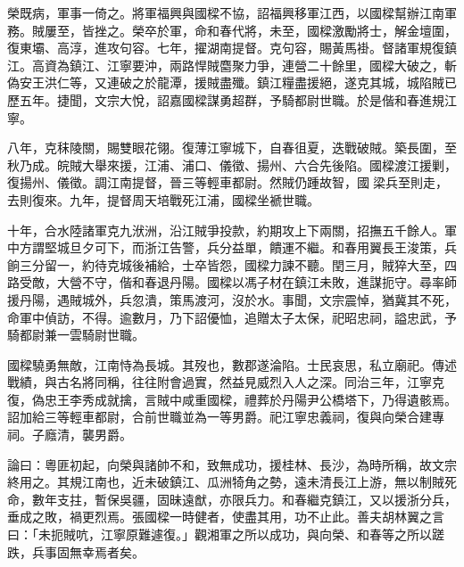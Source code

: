 \begin{pinyinscope}
榮既病，軍事一倚之。將軍福興與國樑不協，詔福興移軍江西，以國樑幫辦江南軍務。賊屢至，皆挫之。榮卒於軍，命和春代將，未至，國樑激勵將士，解金壇圍，復東壩、高淳，進攻句容。七年，擢湖南提督。克句容，賜黃馬褂。督諸軍規復鎮江。高資為鎮江、江寧要沖，兩路悍賊麕聚力爭，連營二十餘里，國樑大破之，斬偽安王洪仁等，又連破之於龍潭，援賊盡殲。鎮江糧盡援絕，遂克其城，城陷賊已歷五年。捷聞，文宗大悅，詔嘉國樑謀勇超群，予騎都尉世職。於是偕和春進規江寧。

八年，克秣陵關，賜雙眼花翎。復薄江寧城下，自春徂夏，迭戰破賊。築長圍，至秋乃成。皖賊大舉來援，江浦、浦口、儀徵、揚州、六合先後陷。國樑渡江援剿，復揚州、儀徵。調江南提督，晉三等輕車都尉。然賊仍踵故智，國梁兵至則走，去則復來。九年，提督周天培戰死江浦，國樑坐褫世職。

十年，合水陸諸軍克九洑洲，沿江賊爭投款，約期攻上下兩關，招撫五千餘人。軍中方謂堅城旦夕可下，而浙江告警，兵分益單，饋運不繼。和春用翼長王浚策，兵餉三分留一，約待克城後補給，士卒皆怨，國樑力諫不聽。閏三月，賊猝大至，四路受敵，大營不守，偕和春退丹陽。國樑以馮子材在鎮江未敗，進謀扼守。尋率師援丹陽，遇賊城外，兵忽潰，策馬渡河，沒於水。事聞，文宗震悼，猶冀其不死，命軍中偵訪，不得。逾數月，乃下詔優恤，追贈太子太保，祀昭忠祠，謚忠武，予騎都尉兼一雲騎尉世職。

國樑驍勇無敵，江南恃為長城。其歿也，數郡遂淪陷。士民哀思，私立廟祀。傳述戰績，與古名將同稱，往往附會過實，然益見威烈入人之深。同治三年，江寧克復，偽忠王李秀成就擒，言賊中咸重國樑，禮葬於丹陽尹公橋塔下，乃得遺骸焉。詔加給三等輕車都尉，合前世職並為一等男爵。祀江寧忠義祠，復與向榮合建專祠。子廕清，襲男爵。

論曰：粵匪初起，向榮與諸帥不和，致無成功，援桂林、長沙，為時所稱，故文宗終用之。其規江南也，近未破鎮江、瓜洲犄角之勢，遠未清長江上游，無以制賊死命，數年支拄，暫保吳疆，固昧遠猷，亦限兵力。和春繼克鎮江，又以援浙分兵，垂成之敗，禍更烈焉。張國樑一時健者，使盡其用，功不止此。善夫胡林翼之言曰：「未扼賊吭，江寧原難遽復。」觀湘軍之所以成功，與向榮、和春等之所以蹉跌，兵事固無幸焉者矣。


\end{pinyinscope}